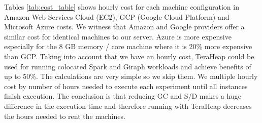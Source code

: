 Tables \ref{tab:cost_table} shows hourly cost for each machine configuration in 
Amazon Web Services Cloud (EC2), GCP (Google Cloud Platform) and Microsoft Azure costs. 
We witness that Amazon and Google providers offer a similar cost for identical machines to our server.
Azure is more expensive especially for the 8 GB memory / core machine where it is 20\% more expensive than GCP.
Taking into account that we have an hourly cost,
TeraHeap could be used for running colocated Spark and Giraph workloads
and achieve benefits of up to 50\%. The calculations are very simple so we skip them. We multiple hourly cost
by number of hours needed to execute each experiment until all instances finish execution. The conclusion is that reducing GC and S/D makes a huge difference in the execution time and therefore running with TeraHeap decreases the hours needed to rent the machines.

